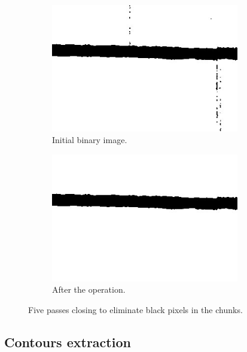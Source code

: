 \begin{figure}[!ht]
\centering
    \begin{subfigure}[t]{0.45\textwidth}
    \centering
    \includegraphics[width=0.9\textwidth]{images/morpho-before}
    \caption{Initial binary image.}
    \label{fig:morphobef}
    \end{subfigure}
    \begin{subfigure}[t]{0.45\textwidth}
    \centering
    \includegraphics[width=0.9\textwidth]{images/morpho-after}
    \caption{After the operation.}
    \label{fig:morphoaft}
    \end{subfigure}
    \caption{Five passes closing to eliminate black pixels in the chunks.}
    \label{fig:morphoex}
\end{figure}

\subsection{Contours extraction}

